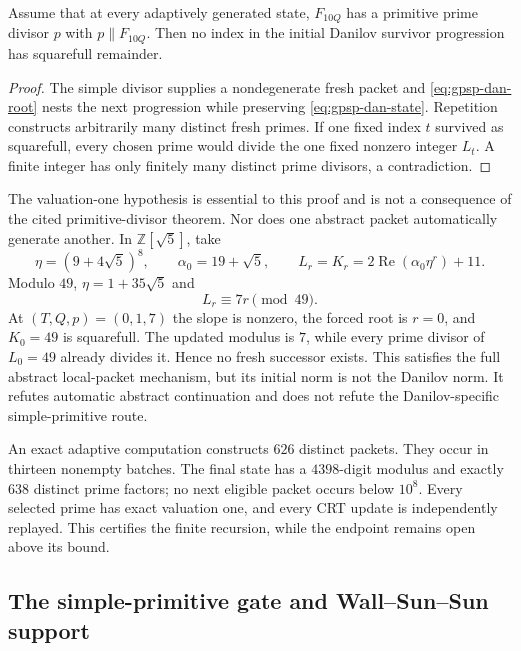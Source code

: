 \begin{theorem}
\label{thm:gpsp-dan-conditional}
Assume that at every adaptively generated state, $F_{10Q}$ has a primitive
prime divisor $p$ with $p\parallel F_{10Q}$.  Then no index in the initial
Danilov survivor progression has squarefull remainder.
\end{theorem}

\begin{proof}
The simple divisor supplies a nondegenerate fresh packet and
\eqref{eq:gpsp-dan-root} nests the next progression while preserving
\eqref{eq:gpsp-dan-state}.  Repetition constructs arbitrarily many distinct
fresh primes.  If one fixed index $t$ survived as squarefull, every chosen
prime would divide the one fixed nonzero integer $L_t$.  A finite integer has
only finitely many distinct prime divisors, a contradiction.
\end{proof}

The valuation-one hypothesis is essential to this proof and is not a
consequence of the cited primitive-divisor theorem.  Nor does one abstract
packet automatically generate another.  In $\mathbb Z[\sqrt5]$, take
\[
 \eta=(9+4\sqrt5)^8,\qquad \alpha_0=19+\sqrt5,\qquad
 L_r=K_r=2\operatorname{Re}(\alpha_0\eta^r)+11.
\]
Modulo $49$, $\eta=1+35\sqrt5$ and
\begin{equation}\label{eq:gpsp-dan-countermodel}
                              L_r\equiv7r\pmod{49}.
\end{equation}
At $(T,Q,p)=(0,1,7)$ the slope is nonzero, the forced root is $r=0$, and
$K_0=49$ is squarefull.  The updated modulus is $7$, while every prime
divisor of $L_0=49$ already divides it.  Hence no fresh successor exists.
This satisfies the full abstract local-packet mechanism, but its initial norm
is not the Danilov norm.  It refutes automatic abstract continuation and does
not refute the Danilov-specific simple-primitive route.

An exact adaptive computation constructs $626$ distinct packets.  They occur
in thirteen nonempty batches.  The final state has a $4398$-digit modulus and
exactly $638$ distinct prime factors; no next eligible packet occurs below
$10^8$.  Every selected prime has exact valuation one, and every CRT update
is independently replayed.  This certifies the finite recursion, while the
endpoint remains open above its bound.

\subsection{The simple-primitive gate and Wall--Sun--Sun support}

